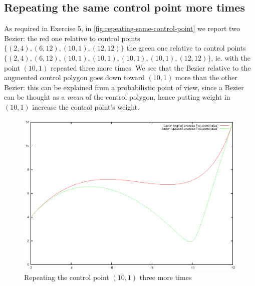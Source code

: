 \documentclass{article}
\begin{document}
\subsection{Repeating the same control point more times}
As required in Exercise 5, in
\autoref{fig:repeating-same-control-point} we report two Bezier: the
red one relative to control points $\{(2,4), (6,12), (10,1),
(12,12)\}$ the green one relative to control points $\{(2,4), (6,12),
(10,1), (10,1), (10,1), (10,1), (12,12)\}$, ie. with the point
$(10,1)$ repeated three more times. We see that the Bezier relative to
the augmented control polygon goes down toward $(10,1)$ more than the
other Bezier: this can be explained from a probabilistic point of
view, since a Bezier can be thought as a \emph{mean} of the control
polygon, hence putting weight in $(10,1)$ increase the control point's
weight.
\begin{figure}
  \centering
  \includegraphics{bezier-deCasteljau-curves/exercise-five}
  \caption{Repeating the control point $(10,1)$ three more times}
  \label{fig:repeating-same-control-point}
\end{figure}
\end{document}
